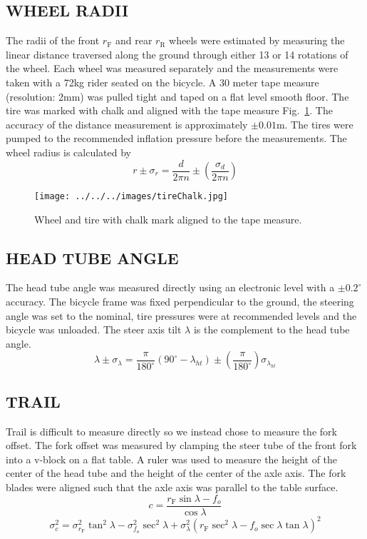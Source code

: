 \documentclass{bmd2010p}
\begin{document}
\subsection{WHEEL RADII}
The radii of the front $r_\mathrm{F}$ and rear $r_\mathrm{R}$ wheels were
estimated by measuring the linear distance traversed along the ground through
either 13 or 14 rotations of the wheel. Each wheel was measured separately and
the measurements were taken with a 72kg rider seated on the bicycle. A 30 meter
tape measure (resolution: 2mm) was pulled tight and taped on a flat level smooth floor. The tire
was marked with chalk and aligned with the tape measure
Fig.~\ref{fig:tireChalk}. The accuracy of the
distance measurement is approximately $\pm0.01$m. The tires were pumped to the
recommended inflation pressure before the measurements. The wheel radius is
calculated by
\begin{equation}
	r\pm\sigma_r=
    \frac{d}{2\pi n}
    \pm\left(\frac{\sigma_d}{2\pi n}\right)
	\label{eq:wheelRadius}
\end{equation}
\begin{figure}[tb]
	\begin{center}
		\texttt{[image: ../../../images/tireChalk.jpg]}
	\end{center}
	\caption{Wheel and tire with chalk mark aligned to the tape measure.}
	\label{fig:tireChalk}
\end{figure}
\subsection{HEAD TUBE ANGLE}
\label{sec:headtube}
The head tube angle was measured directly using an electronic level with a
$\pm0.2^{\circ}$ accuracy. The bicycle frame was fixed perpendicular to the
ground, the steering angle was set to the nominal, tire pressures were at
recommended levels and the bicycle was unloaded. The steer axis
tilt $\lambda$ is the complement to the head tube angle.
\begin{equation}
    \lambda\pm\sigma_\lambda
    =\frac{\pi}{180^{\circ}}(90^{\circ}-\lambda_{ht})
    \pm\left(\frac{\pi}{180^\circ}\right)\sigma_{\lambda_{ht}}
\label{eq:headTubeAngle}
\end{equation}
\subsection{TRAIL}
Trail is difficult to measure directly so we instead chose to measure the fork
offset. The fork offset was measured by clamping the steer tube of the front
fork into a v-block on a flat table. A ruler was used to measure the height of
the center of the head tube and the height of the center of the axle axis. The
fork blades were aligned such that the axle axis was parallel to the table
surface.
\begin{equation}
	c=\frac{r_\mathrm{F}\sin{\lambda}-f_o}{\cos{\lambda}}
	\label{eq:trail}
\end{equation}
\begin{equation}
    \sigma_{c}^{2}=\sigma_{r_{\mathrm{F}}}^{2}\tan^2{\lambda} -
    \sigma_{f_o}^{2}\sec^2{\lambda} +
    \sigma_{\lambda}^{2}\left(r_\mathrm{F}\sec^2{\lambda} -
    f_o\sec{\lambda}\tan{\lambda}\right)^2
    \label{eq:TrailVar}
\end{equation}
\end{document}
